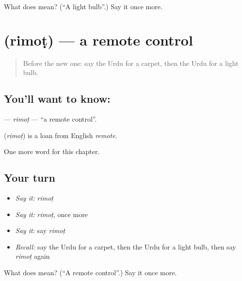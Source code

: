 \begin{tcolorbox}[breakable,colback=teal!4,colframe=teal!35!black,title={Before you move on}]
What does  mean? (\textquotedblleft{}A light bulb\textquotedblright{}.) Say it once more.
\end{tcolorbox}
\section[\texorpdfstring{\ur{ریموٹ} (rimoṭ)}{ریموٹ (rimoṭ)}]{ (rimoṭ) — a remote control}

\label{lesson:UR-C165-rimot}



\begin{quote}
Before the new one: say the Urdu for a carpet, then the Urdu for a light bulb.
\end{quote}

\subsection*{You'll want to know: }
\textbf{} — \emph{rimoṭ} — \textquotedblleft{}a remote control\textquotedblright{}.

\begin{cousinweb}
\textbf{} (\emph{rimoṭ}) is a loan from English \emph{remote}.
\end{cousinweb}

\begin{grammarlens}[title={What you've built}]
One more word for this chapter.
\end{grammarlens}

\subsection*{Your turn}
\begin{itemize}
\raggedright
  \item \emph{Say it:} \emph{rimoṭ}
  \item \emph{Say it:} \emph{rimoṭ}, once more
  \item \emph{Say it:} say \emph{rimoṭ}
  \item \emph{Recall:} say the Urdu for a carpet, then the Urdu for a light bulb, then say \emph{rimoṭ} again
\end{itemize}

\begin{tcolorbox}[breakable,colback=teal!4,colframe=teal!35!black,title={Before you move on}]
What does  mean? (\textquotedblleft{}A remote control\textquotedblright{}.) Say it once more.
\end{tcolorbox}
